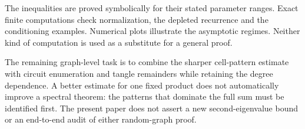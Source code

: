 The inequalities are proved symbolically for their stated parameter ranges. Exact finite computations check normalization, the depleted recurrence and the conditioning examples. Numerical plots illustrate the asymptotic regimes. Neither kind of computation is used as a substitute for a general proof.

The remaining graph-level task is to combine the sharper cell-pattern estimate with circuit enumeration and tangle remainders while retaining the degree dependence. A better estimate for one fixed product does not automatically improve a spectral theorem: the patterns that dominate the full sum must be identified first. The present paper does not assert a new second-eigenvalue bound or an end-to-end audit of either random-graph proof.
